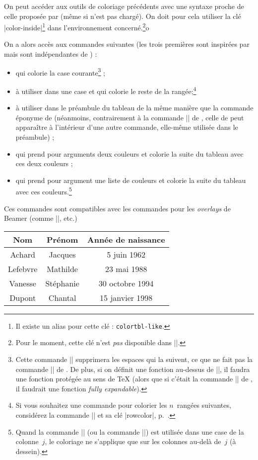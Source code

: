 \documentclass[dvipsnames]{article}%
\begin{document}
On peut accéder aux outils de coloriage précédents avec une syntaxe proche de
celle proposée par  (même si  n'est pas chargé). On
doit pour cela utiliser la clé |color-inside|\footnote{Il existe un alias pour
  cette clé : \texttt{colortbl-like}.} dans l'environnement
concerné.\footnote{Pour le moment, cette clé n'est \emph{pas} disponible dans
  |\NiceMatrixOptions|.}o

On a alors accès aux commandes suivantes (les trois premières sont inspirées par
 mais sont indépendantes de ) :
\begin{itemize}
\item {} qui colorie la case courante\footnote{Cette
  commande |\cellcolor| supprimera les espaces qui la suivent, ce que ne fait
  pas la commande |\cellcolor| de . De plus, si on définit une
  fonction au-dessus de |\cellcolor|, il faudra une fonction protégée au sens de
TeX (alors que si c'était la commande |\cellcolor| de , il
faudrait une fonction \emph{fully expandable}).} ;
\item {} à utiliser dans une case et qui colorie le
reste de la rangée;\footnote{Si vous souhaitez une commande pour colorier les
  $n$~rangées suivantes, considérez la commande |\RowStyle| et sa clé
  |rowcolor|, p.~\pageref{RowStyle}.} 
\item {} à utiliser dans le préambule du tableau
de la même manière que la commande éponyme de  (néanmoins,
contrairement à la commande |\columncolor| de , celle de
 peut apparaître à l'intérieur d'une autre commande, elle-même
utilisée dans le préambule) ;
\item {} qui prend pour arguments deux couleurs et
colorie la suite du tableau avec ces deux couleurs ;
\item {} qui prend pour argument une liste de
couleurs et colorie la suite du tableau avec ces couleurs.\footnote{Quand la
  commande |\rowlistcolors| (ou la commande |\rowcolors|) est utilisée dans une
  case de la colonne~$j$, le coloriage ne s'applique que sur les colonnes
  au-delà de~$j$ (à dessein).}
\end{itemize}
Ces commandes sont compatibles avec les commandes pour les \emph{overlays} de
Beamer (comme |\only|, etc.)

\medskip
\begin{Code}
\NewDocumentCommand { \Blue } { } {\emph{}}
\begin{NiceTabular}{>{\Blue}c>{\Blue}cc}
\toprule
\emph{}
Nom & Prénom & Année de naissance \\
\midrule
Achard & Jacques & 5 juin 1962 \\
Lefebvre & Mathilde & 23 mai 1988 \\
Vanesse & Stéphanie & 30 octobre 1994 \\
Dupont & Chantal & 15 janvier 1998 \\
\bottomrule
\end{NiceTabular}
\end{Code}
\end{document}
